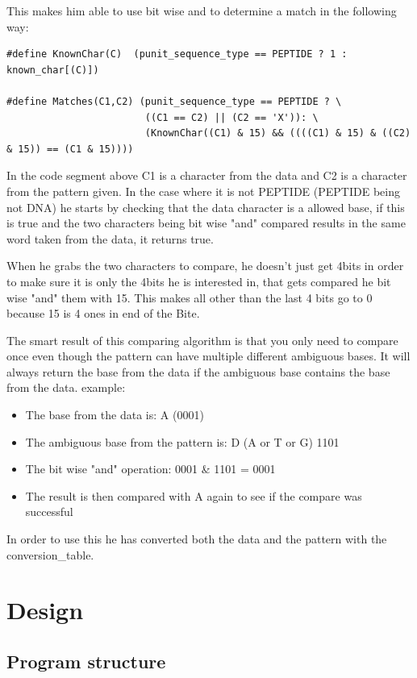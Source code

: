 \documentclass[12pt]{article}
\begin{document}
This makes him able to use bit wise and to determine a match in the following way:
\begin{lstlisting}
#define KnownChar(C)  (punit_sequence_type == PEPTIDE ? 1 : known_char[(C)])

#define Matches(C1,C2) (punit_sequence_type == PEPTIDE ? \
                        ((C1 == C2) || (C2 == 'X')): \
                        (KnownChar((C1) & 15) && ((((C1) & 15) & ((C2) & 15)) == (C1 & 15))))

\end{lstlisting}
In the code segment above C1 is a character from the data and C2 is a character from the pattern given. In the case where it is not PEPTIDE (PEPTIDE being not DNA) he starts by checking that the data character is a allowed base, if this is true and the two characters being bit wise "and" compared results in the same word taken from the data, it returns true. 

When he grabs the two characters to compare, he doesn't just get 4bits in order to make sure it is only the 4bits he is interested in, that gets compared he bit wise "and" them with 15. This makes all other than the last 4 bits go to 0 because 15 is 4 ones in end of the Bite.

The smart result of this comparing algorithm is that you only need to compare once even though the pattern can have multiple different ambiguous bases. It will always return the base from the data if the ambiguous base contains the base from the data. example: \\
\begin{itemize}
\item The base from the data is: A (0001)
\item The ambiguous base from the pattern is: D (A or T or G) 1101
\item The bit wise "and" operation: 0001 \& 1101 = 0001
\item The result is then compared with A again to see if the compare was successful
\end{itemize}
In order to use this he has converted both the data and the pattern with the conversion\_table. \\
\section{Design}

\subsection{Program structure}
\end{document}
